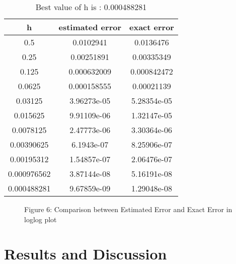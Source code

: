 \documentclass[a4paper]{article}
\begin{document}
\begin{table}[H]
\centering
\begin{tabular}{|c|c|c|}
\hline
h & estimated error & exact error \\
\hline
0.5 & 0.0102941 & 0.0136476 \\
0.25 & 0.00251891 & 0.00335349 \\
0.125 & 0.000632009 & 0.000842472 \\
0.0625 & 0.000158555 & 0.00021139 \\
0.03125 & 3.96273e-05 & 5.28354e-05 \\
0.015625 & 9.91109e-06 & 1.32147e-05 \\
0.0078125 & 2.47773e-06 & 3.30364e-06 \\
0.00390625 & 6.1943e-07 & 8.25906e-07 \\
0.00195312 & 1.54857e-07 & 2.06476e-07 \\
0.000976562 & 3.87144e-08 & 5.16191e-08 \\
0.000488281 & 9.67859e-09 & 1.29048e-08 \\
\hline
\end{tabular}
\caption{Best value of h is : 0.000488281}
\end{table}

     
	\begin{figure}[H]
    \centering
    \caption{Figure 6: Comparison between Estimated Error and Exact Error in loglog plot}
	\end{figure}
	

    
    
    \section{Results and Discussion}
    
\end{document}
